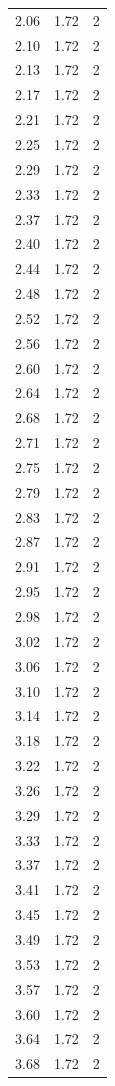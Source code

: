 \begin{longtable}{lrr}
  2.06 & 1.72 & 2 \\
  2.10 & 1.72 & 2 \\
  2.13 & 1.72 & 2 \\
  2.17 & 1.72 & 2 \\
  2.21 & 1.72 & 2 \\
  2.25 & 1.72 & 2 \\
  2.29 & 1.72 & 2 \\
  2.33 & 1.72 & 2 \\
  2.37 & 1.72 & 2 \\
  2.40 & 1.72 & 2 \\
  2.44 & 1.72 & 2 \\
  2.48 & 1.72 & 2 \\
  2.52 & 1.72 & 2 \\
  2.56 & 1.72 & 2 \\
  2.60 & 1.72 & 2 \\
  2.64 & 1.72 & 2 \\
  2.68 & 1.72 & 2 \\
  2.71 & 1.72 & 2 \\
  2.75 & 1.72 & 2 \\
  2.79 & 1.72 & 2 \\
  2.83 & 1.72 & 2 \\
  2.87 & 1.72 & 2 \\
  2.91 & 1.72 & 2 \\
  2.95 & 1.72 & 2 \\
  2.98 & 1.72 & 2 \\
  3.02 & 1.72 & 2 \\
  3.06 & 1.72 & 2 \\
  3.10 & 1.72 & 2 \\
  3.14 & 1.72 & 2 \\
  3.18 & 1.72 & 2 \\
  3.22 & 1.72 & 2 \\
  3.26 & 1.72 & 2 \\
  3.29 & 1.72 & 2 \\
  3.33 & 1.72 & 2 \\
  3.37 & 1.72 & 2 \\
  3.41 & 1.72 & 2 \\
  3.45 & 1.72 & 2 \\
  3.49 & 1.72 & 2 \\
  3.53 & 1.72 & 2 \\
  3.57 & 1.72 & 2 \\
  3.60 & 1.72 & 2 \\
  3.64 & 1.72 & 2 \\
  3.68 & 1.72 & 2 \\

\end{longtable}
